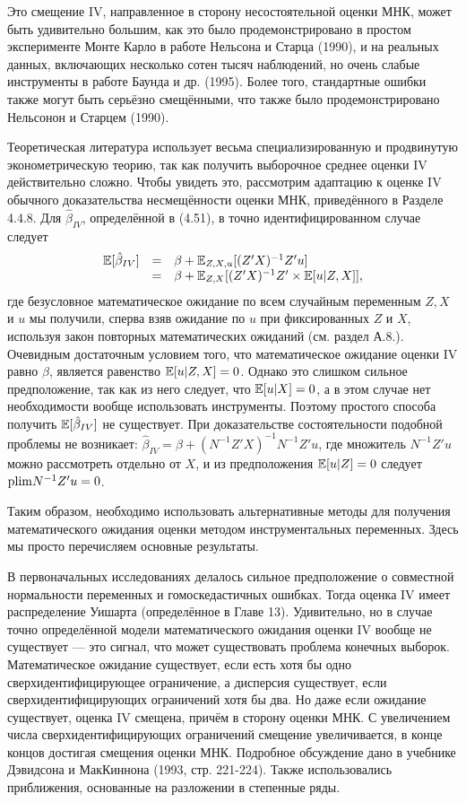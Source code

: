 Это смещение IV, направленное в сторону несостоятельной оценки МНК, может быть удивительно большим, как это было продемонстрировано в простом эксперименте Монте Карло в работе Нельсона и Старца (1990), и на  реальных данных, включающих несколько сотен тысяч наблюдений, но очень слабые инструменты в работе Баунда и др. (1995). Более того, стандартные ошибки также могут быть серьёзно смещёнными, что также было продемонстрировано  Нельсонон и Старцем (1990).

Теоретическая литература использует весьма специализированную и продвинутую эконометрическую теорию, так как получить выборочное среднее оценки IV действительно сложно. Чтобы увидеть это, рассмотрим адаптацию к оценке IV обычного доказательства несмещённости оценки МНК, приведённого в Разделе 4.4.8. Для $\hat{\beta}_{IV}$, определённой в (4.51), в точно идентифицированном случае следует
\[
\begin{array}{rcl}
\mathbb{E}[\hat{\beta}_{IV}] & = & \beta + \mathbb{E}_{Z,X,u}[(Z'X)^{-1}Z'u] \\
& = &  \beta + \mathbb{E}_{Z,X}[(Z'X)^{-1}Z' \times \mathbb{E}[u|Z,X]],
\end{array}
\]
где безусловное математическое ожидание по всем случайным переменным $Z, X$ и $u$ мы получили, сперва взяв ожидание по $u$ при фиксированных $Z$ и $X$, используя закон повторных математических ожиданий (см. раздел А.8.). Очевидным достаточным условием того, что математическое ожидание оценки IV равно $\beta$, является равенство $\mathbb{E}[u|Z,X]=0$. Однако это слишком сильное предположение, так как из него следует, что $\mathbb{E}[u|X]=0$, а в этом случае нет необходимости вообще использовать инструменты. Поэтому простого способа получить $\mathbb{E}[\hat{\beta}_{IV}]$ не существует. При доказательстве состоятельности подобной проблемы не возникает: $\hat{\beta}_{IV} = \beta +(N^{-1}Z'X)^{-1}N^{-1}Z'u$, где множитель $N^{-1}Z'u$ можно рассмотреть отдельно от $X$, и из предположения $\mathbb{E}[u|Z]=0$ следует $\mathrm{plim } N^{-1}Z'u=0$.

Таким образом, необходимо использовать альтернативные методы для получения математического ожидания оценки методом инструментальных переменных. Здесь мы просто перечисляем основные результаты.

В первоначальных исследованиях делалось сильное предположение о совместной нормальности переменных и гомоскедастичных ошибках. Тогда оценка IV имеет распределение Уишарта (определённое в Главе 13). Удивительно, но в случае точно определённой модели математического ожидания оценки IV вообще не существует --- это сигнал, что может существовать проблема конечных выборок. Математическое ожидание существует, если есть хотя бы одно сверхидентифицирующее ограничение, а дисперсия существует, если сверхидентифицирующих ограничений хотя бы два. Но даже если ожидание существует, оценка IV смещена, причём в сторону оценки МНК. С увеличением числа сверхидентифицирующих ограничений смещение увеличивается, в конце концов достигая смещения оценки МНК. Подробное обсуждение дано в учебнике Дэвидсона и МакКиннона (1993, стр. 221-224). Также использовались приближения, основанные на разложении в степенные ряды.

